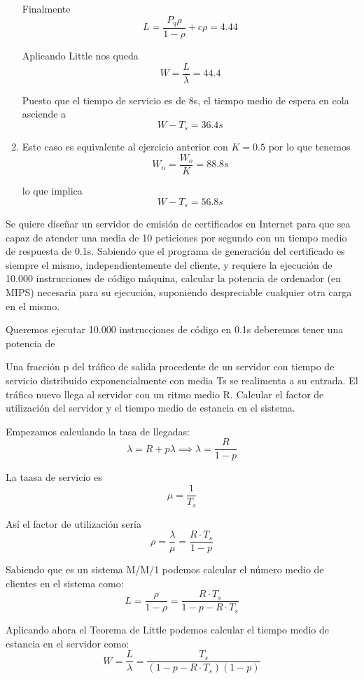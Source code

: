 \begin{problem}[3]
\begin{enumerate}
Finalmente
\[L=\frac{P_q ρ}{1-ρ}+cρ=4.44\]

Aplicando Little nos queda
\[W = \frac{L}{λ}=44.4\]

Puesto que el tiempo de servicio es de 8s, el tiempo medio de espera en cola asciende a
\[W-T_s=\boxed{36.4s}\]
\item

Este caso es equivalente al ejercicio anterior con $K=0.5$ por lo que tenemos
\[W_n =\frac{W_o}{K}=88.8s\]

lo que implica
\[W-T_s = \boxed{56.8s}\]
\end{enumerate}

\end{problem}


\begin{problem}[4]
Se quiere diseñar un servidor de emisión de certificados en Internet para que sea capaz de atender una media de 10 peticiones por segundo con un tiempo medio de respuesta de 0.1s. Sabiendo que el programa de generación del certificado es siempre el mismo, independientemente del cliente, y requiere la ejecución de 10.000 instrucciones de código máquina, calcular la potencia de ordenador (en MIPS) necesaria para su ejecución,
suponiendo despreciable cualquier otra carga en el mismo.

\solution

Queremos ejecutar 10.000 instrucciones de código en 0.1s deberemos tener una potencia de 


\end{problem}


\begin{problem}[5]
Una fracción p del tráfico de salida procedente de un servidor con tiempo de servicio distribuido exponencialmente con media Ts se realimenta a su entrada. El tráfico nuevo llega al servidor con un ritmo medio R. Calcular el factor de utilización del servidor y el tiempo medio de estancia en el
sistema.

\solution

Empezamos calculando la tasa de llegadas:
\[λ = R + pλ \implies λ = \frac{R}{1-p}\]

La taasa de servicio es
\[μ= \frac{1}{T_s}\]

Así el factor de utilización sería
\[ρ=\frac{λ}{μ}=\boxed{\frac{R \cdot T_s}{1-p}}\]

Sabiendo que es un sistema M/M/1 podemos calcular el número medio de clientes en el sistema como:
\[L = \frac{ρ}{1-ρ}=\frac{R\cdot T_s}{1-p-R\cdot T_s}\]

Aplicando ahora el Teorema de Little podemos calcular el tiempo medio de estancia en el servidor como:
\[W = \frac{L}{λ}=\boxed{\frac{T_s}{(1-p-R\cdot T_s)(1-p)}}\]

\end{problem}

